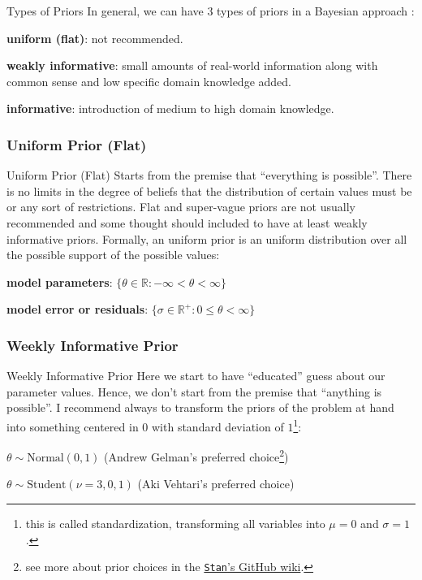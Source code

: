 \begin{frame}{Types of Priors}
	In general, we can have 3 types of priors in a Bayesian approach
	\parencite{gelman2013bayesian, mcelreath2020statistical, vandeschootBayesianStatisticsModelling2021}:
	\begin{vfilleditems}
		\item \textbf{uniform (flat)}: not recommended.
		\item \textbf{weakly informative}: small amounts of real-world information
		along with common sense and low specific domain knowledge added.
		\item \textbf{informative}: introduction of medium to high domain knowledge.
	\end{vfilleditems}
\end{frame}

\subsubsection{Uniform Prior (Flat)}
\begin{frame}{Uniform Prior (Flat)}
	Starts from the premise that ``everything is possible''.
	There is no limits in the degree of beliefs that the distribution of certain
	values must be or any sort of restrictions.
	\vfill
	Flat and super-vague priors are not usually recommended and some thought
	should included to have at least weakly informative priors.
	\vfill
	Formally, an uniform prior is an uniform distribution over all the
	possible support of the possible values:
	\begin{vfilleditems}
		\item \textbf{model parameters}: $\{\theta \in \mathbb{R} : -\infty < \theta < \infty\}$
		\item \textbf{model error or residuals}: $\{\sigma \in \mathbb{R}^+ : 0 \leq \theta < \infty\}$
	\end{vfilleditems}
\end{frame}

\subsubsection{Weekly Informative Prior}
\begin{frame}{Weekly Informative Prior}
	Here we start to have ``educated'' guess about our parameter values.
	Hence, we don't start from the premise that ``anything is possible''.
	\vfill
	I recommend always to transform the priors of the problem at hand into
	something centered in $0$ with standard deviation of $1$\footnote{
		this is called standardization,
		transforming all variables into $\mu=0$ and $\sigma=1$.}:
	\vfill
	\begin{vfilleditems}
		\item $\theta \sim \text{Normal}(0, 1)$ (Andrew Gelman's preferred choice\footnote{
			see more about prior choices in the
			\href{https://github.com/stan-dev/stan/wiki/Prior-Choice-Recommendations}{\texttt{Stan}'s GitHub wiki}.})
		\item $\theta \sim \text{Student}(\nu=3, 0, 1)$ (Aki Vehtari's preferred choice)
	\end{vfilleditems}
\end{frame}

